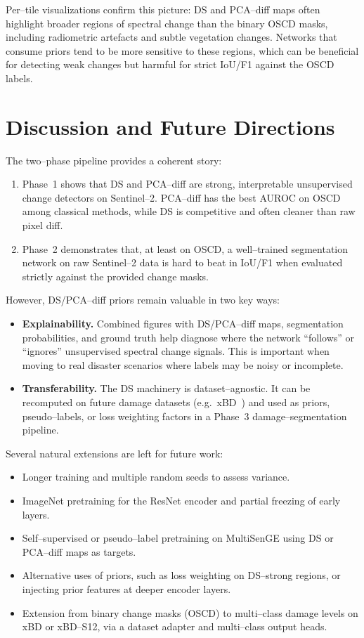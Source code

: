 \documentclass[twoside,11pt]{article}
\begin{document}
Per--tile visualizations confirm this picture: DS and PCA--diff maps often
highlight broader regions of spectral change than the binary OSCD masks,
including radiometric artefacts and subtle vegetation changes. Networks that
consume priors tend to be more sensitive to these regions, which can be
beneficial for detecting weak changes but harmful for strict IoU/F1 against
the OSCD labels.

\section{Discussion and Future Directions}

The two--phase pipeline provides a coherent story:

\begin{enumerate}
  \item Phase~1 shows that DS and PCA--diff are strong, interpretable
  unsupervised change detectors on Sentinel--2. PCA--diff has the best AUROC
  on OSCD among classical methods, while DS is competitive and often cleaner
  than raw pixel diff.
  \item Phase~2 demonstrates that, at least on OSCD, a well--trained
  segmentation network on raw Sentinel--2 data is hard to beat in IoU/F1 when
  evaluated strictly against the provided change masks.
\end{enumerate}

However, DS/PCA--diff priors remain valuable in two key ways:

\begin{itemize}
  \item \textbf{Explainability.} Combined figures with DS/PCA--diff maps,
  segmentation probabilities, and ground truth help diagnose where the network
  ``follows'' or ``ignores'' unsupervised spectral change signals. This is
  important when moving to real disaster scenarios where labels may be noisy
  or incomplete.
  \item \textbf{Transferability.} The DS machinery is dataset--agnostic. It can
  be recomputed on future damage datasets (e.g.\ xBD~\cite{Gupta2019xBD}) and
  used as priors, pseudo--labels, or loss weighting factors in a Phase~3
  damage--segmentation pipeline.
\end{itemize}

Several natural extensions are left for future work:

\begin{itemize}
  \item Longer training and multiple random seeds to assess variance.
  \item ImageNet pretraining for the ResNet encoder and partial freezing of
  early layers.
  \item Self--supervised or pseudo--label pretraining on MultiSenGE using DS
  or PCA--diff maps as targets.
  \item Alternative uses of priors, such as loss weighting on DS--strong
  regions, or injecting prior features at deeper encoder layers.
  \item Extension from binary change masks (OSCD) to multi--class damage
  levels on xBD or xBD--S12, via a dataset adapter and multi--class output
  heads.
\end{itemize}
\end{document}
